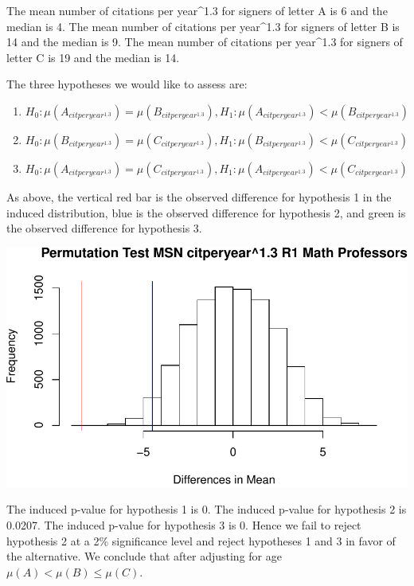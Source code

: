 \documentclass[]{article}
\begin{document}
The mean number of citations per year\^{}1.3 for signers of letter A is
6 and the median is 4. The mean number of citations per year\^{}1.3 for
signers of letter B is 14 and the median is 9. The mean number of
citations per year\^{}1.3 for signers of letter C is 19 and the median
is 14.

The three hypotheses we would like to assess are:

\begin{enumerate}
\def\labelenumi{\arabic{enumi}.}
\item
  \(H_0: \mu(A_{citperyear^{1.3}}) = \mu(B_{citperyear^{1.3}}), H_1: \mu(A_{citperyear^{1.3}}) < \mu(B_{citperyear^{1.3}})\)
\item
  \(H_0: \mu(B_{citperyear^{1.3}}) = \mu(C_{citperyear^{1.3}}), H_1: \mu(B_{citperyear^{1.3}}) < \mu(C_{citperyear^{1.3}})\)
\item
  \(H_0: \mu(A_{citperyear^{1.3}}) = \mu(C_{citperyear^{1.3}}), H_1: \mu(A_{citperyear^{1.3}}) < \mu(C_{citperyear^{1.3}})\)
\end{enumerate}

As above, the vertical red bar is the observed difference for hypothesis
1 in the induced distribution, blue is the observed difference for
hypothesis 2, and green is the observed difference for hypothesis 3.

\includegraphics{index_files/figure-latex/unnamed-chunk-34-1.pdf}

The induced p-value for hypothesis 1 is 0. The induced p-value for
hypothesis 2 is 0.0207. The induced p-value for hypothesis 3 is 0. Hence
we fail to reject hypothesis 2 at a 2\% significance level and reject
hypotheses 1 and 3 in favor of the alternative. We conclude that after
adjusting for age \(\mu(A) < \mu(B) \leq \mu(C)\).
\end{document}
